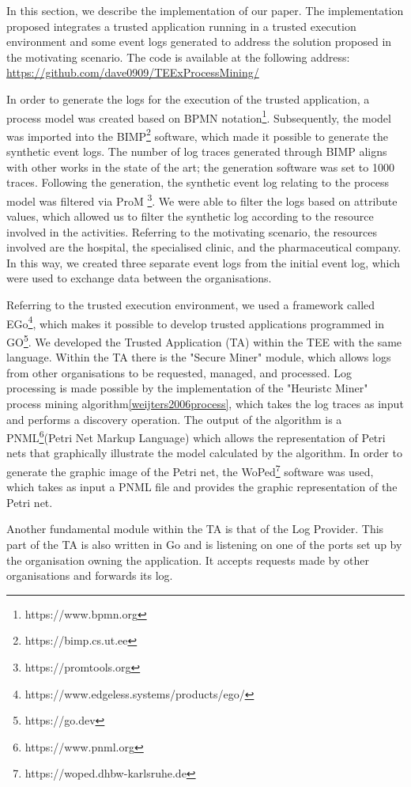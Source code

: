 In this section, we describe the implementation of our paper. The implementation proposed integrates a trusted application running in a
trusted execution environment and some event logs generated to address the solution proposed in the motivating scenario. The code is available at the following address: \url{https://github.com/dave0909/TEExProcessMining/}

In order to generate the logs for the execution of the trusted application, a process model was created based on BPMN notation\footnote{https://www.bpmn.org}. Subsequently, the model was imported into the BIMP\footnote{https://bimp.cs.ut.ee} software, which made it possible to generate the synthetic event logs. The number of log traces generated through BIMP aligns with other works in the state of the art; the generation software was set to 1000 traces. Following the generation, the synthetic event log relating to the process model was filtered via ProM \footnote{https://promtools.org}. We were able to filter the logs based on attribute values, which allowed us to filter the synthetic log according to the resource involved in the activities. Referring to the motivating scenario, the resources involved are the hospital, the specialised clinic, and the pharmaceutical company. In this way, we created three separate event logs from the initial event log, which were used to exchange data between the organisations.

Referring to the trusted execution environment, we used a framework called EGo\footnote{https://www.edgeless.systems/products/ego/}, which makes it possible to develop trusted applications programmed in GO\footnote{https://go.dev}. We developed the Trusted Application (TA) within the TEE with the same language. Within the TA there is the "Secure Miner" module, which allows logs from other organisations to be requested, managed, and processed. Log processing is made possible by the implementation of the "Heuristc Miner" process mining algorithm\ref{weijters2006process}, which takes the log traces as input and performs a discovery operation.
The output of the algorithm is a PNML\footnote{https://www.pnml.org}(Petri Net Markup Language) which allows the representation of Petri nets that graphically illustrate the model calculated by the algorithm. 
In order to generate the graphic image of the Petri net, the WoPed\footnote{https://woped.dhbw-karlsruhe.de} software was used, which takes as input a PNML file and provides the graphic representation of the Petri net. 

Another fundamental module within the TA is that of the Log Provider. This part of the TA is also written in Go and is listening on one of the ports set up by the organisation owning the application. It accepts requests made by other organisations and forwards its log. 